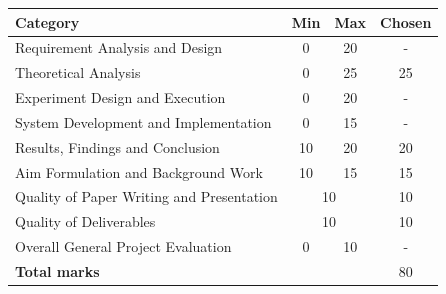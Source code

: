 \documentclass[paper.tex]{subfiles}
\begin{document}
\renewcommand{\arraystretch}{1.25}
\begin{tabular}{|l|c|c|c|}
  \hline
  \textbf{Category} & \textbf{Min} & \textbf{Max} & \textbf{Chosen} \\ \hline \hline
  Requirement Analysis and Design & 0 & 20 &
    - \\ \hline
  Theoretical Analysis & 0 & 25 &
    25 \\ \hline
  Experiment Design and Execution & 0 & 20 &
    - \\ \hline
  System Development and Implementation & 0 & 15 &
    - \\ \hline
  Results, Findings and Conclusion & 10 & 20 &
    20 \\ \hline
  Aim Formulation and Background Work & 10 & 15 &
    15 \\ \hline
  Quality of Paper Writing and Presentation & \multicolumn{2}{c|}{10} &
    10 \\ \hline
  Quality of Deliverables & \multicolumn{2}{c|}{10} &
    10 \\ \hline
  Overall General Project Evaluation & 0 & 10 &
    - \\ \hline
  \hline
  \multicolumn{3}{|l|}{\textbf{Total marks}} & 80 \\ \hline
\end{tabular}

\endgroup
\thispagestyle{empty}
\newpage
\setcounter{page}{1}
\end{document}
